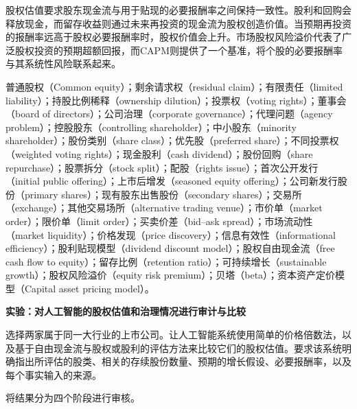 股权估值要求股东现金流与用于贴现的必要报酬率之间保持一致性。股利和回购会释放现金，而留存收益则通过未来再投资的现金流为股权创造价值。当预期再投资的报酬率远高于股权必要报酬率时，股权价值会上升。市场股权风险溢价代表了广泛股权投资的预期超额回报，而CAPM则提供了一个基准，将个股的必要报酬率与其系统性风险联系起来。



普通股权（Common equity）；剩余请求权（residual claim）；有限责任（limited liability）；持股比例稀释（ownership dilution）；投票权（voting rights）；董事会（board of directors）；公司治理（corporate governance）；代理问题（agency problem）；控股股东（controlling shareholder）；中小股东（minority shareholder）；股份类别（share class）；优先股（preferred share）；不同投票权（weighted voting rights）；现金股利（cash dividend）；股份回购（share repurchase）；股票拆分（stock split）；配股（rights issue）；首次公开发行（initial public offering）；上市后增发（seasoned equity offering）；公司新发行股份（primary shares）；现有股东出售股份（secondary shares）；交易所（exchange）；其他交易场所（alternative trading venue）；市价单（market order）；限价单（limit order）；买卖价差（bid--ask spread）；市场流动性（market liquidity）；价格发现（price discovery）；信息有效性（informational efficiency）；股利贴现模型（dividend discount model）；股权自由现金流（free cash flow to equity）；留存比例（retention ratio）；可持续增长（sustainable growth）；股权风险溢价（equity risk premium）；贝塔（beta）；资本资产定价模型（Capital asset pricing model）。



\textbf{实验：对人工智能的股权估值和治理情况进行审计与比较}

选择两家属于同一大行业的上市公司。让人工智能系统使用简单的价格倍数法，以及基于自由现金流与股权或股利的评估方法来比较它们的股权估值。要求该系统明确指出所评估的股类、相关的存续股份数量、预期的增长假设、必要报酬率，以及每个事实输入的来源。

将结果分为四个阶段进行审核。

